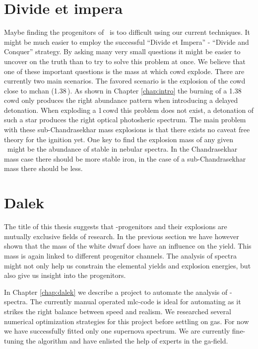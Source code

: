 \section{Divide et impera}

Maybe finding the progenitors of \sneia\ is too difficult using our current techniques. It might be much easier to employ the successful ``Divide et Impera'' - ``Divide and Conquer'' strategy. By asking many very small questions it might be easier to uncover on the truth than to try to solve this problem at once. We believe that one of these important questions is the mass at which \gls{cowd} explode. There are currently two main scenarios. The favored scenario is the explosion of the \gls{cowd} close to \gls{mchan} (1.38\,\msun). As shown in Chapter \ref{chap:intro} the burning of a 1.38\,\msun \gls{cowd} only produces the right abundance pattern when introducing a delayed detonation. When exploding a 1\,\msun \gls{cowd} this problem does not exist, a detonation of such a star produces the right optical photosheric spectrum. The main problem with these sub-Chandrasekhar mass explosions is that there exists no caveat free theory for the ignition yet. One key to find the explosion mass of any given \snia\ might be the abundance of stable in nebular spectra. In the Chandrasekhar mass case there should be more stable iron, in the case of a sub-Chandrasekhar mass there should be less.

\section{Dalek}

The title of this thesis suggests that \snia-progenitors and their explosions are mutually exclusive fields of research. In the previous section we have however shown that the mass of the white dwarf does have an influence on the yield. This mass is again linked to different progenitor channels. The analysis of spectra might not only help us constrain the elemental yields and explosion energies, but also give us insight into the progenitors. 

In Chapter \ref{chap:dalek} we describe a project to automate the analysis of \snia-spectra. The currently manual operated \gls{mlc}-code is ideal for automating as it strikes the right balance between speed and realism. We researched several numerical optimization strategies for this project before settling on \glspl{ga}. For now we have successfully fitted only one supernova spectrum. We are currently fine-tuning the algorithm and have enlisted the help of experts in the \gls{ga}-field. 

